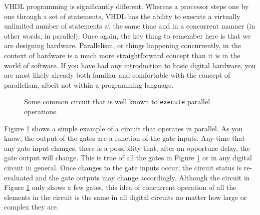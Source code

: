 VHDL programming is significantly different. Whereas a processor steps one by one through a set of statements, VHDL has the ability to execute a virtually unlimited number of statements at the same time and in a concurrent manner (in other words, in parallel). Once again, the key thing to remember here is that we are designing hardware. Parallelism, or things happening concurrently, in the context of hardware is a much more straightforward concept than it is in the world of software. If you have had any introduction to basic digital hardware, you are most likely already both familiar and comfortable with the concept of parallelism, albeit not within a programming language.

\begin{figure}
\centering
\usetikzlibrary{er}
\caption{Some common circuit that is well known to \texttt{execute} parallel operations.}
\label{concurrent_circuit}
\end{figure}

Figure \ref{concurrent_circuit} shows a simple example of a circuit that operates in parallel. As you know, the output of the gates are a function of the gate inputs. Any time that any gate input changes, there is a possibility that, after an opportune delay, the gate output will change. This is true of all the gates in Figure \ref{concurrent_circuit} or in any digital circuit in general. Once changes to the gate inputs occur, the circuit status is re-evaluated and the gate outputs may change accordingly. Although the circuit in Figure \ref{concurrent_circuit} only shows a few gates, this idea of concurrent operation of all the elements in the circuit is the same in all digital circuits no matter how large or complex they are.

